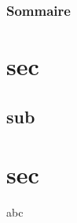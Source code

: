 \documentclass{beamer}
\begin{document}
                                                        

\begin{frame}
    \frametitle{Sommaire}
    \tableofcontents
\end{frame}

\section{sec}
\subsection{sub}
\section{sec}

\begin{frame}
    abc
\end{frame}
\end{document}
